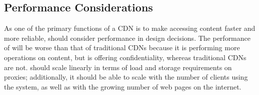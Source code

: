 \subsection{Performance Considerations}
As one of the primary functions of a CDN is to make accessing content faster and more 
reliable, \system{} should consider performance in design decisions.  The performance of \system{} will 
be worse than that of traditional CDNs because it is performing more operations on content, but \system{} 
is offering confidentiality, whereas traditional CDNs are not.  \system{} should scale linearly in terms of load 
and storage requirements on proxies; additionally, it should be able to 
scale with the number of clients using the system, as well as with the growing number of web pages on the internet.







